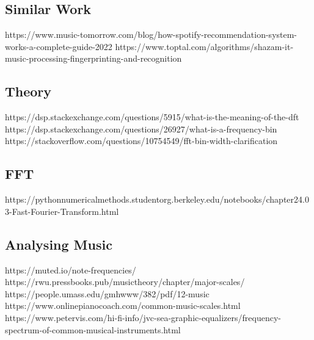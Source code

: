 \documentclass[conference]{IEEEtran}
\begin{document}
\subsection{Similar Work}
https://www.music-tomorrow.com/blog/how-spotify-recommendation-system-works-a-complete-guide-2022
https://www.toptal.com/algorithms/shazam-it-music-processing-fingerprinting-and-recognition
\subsection{Theory}
https://dsp.stackexchange.com/questions/5915/what-is-the-meaning-of-the-dft
https://dsp.stackexchange.com/questions/26927/what-is-a-frequency-bin
https://stackoverflow.com/questions/10754549/fft-bin-width-clarification
\subsection{FFT}
https://pythonnumericalmethods.studentorg.berkeley.edu/notebooks/chapter24.03-Fast-Fourier-Transform.html
\subsection{Analysing Music}
https://muted.io/note-frequencies/
https://rwu.pressbooks.pub/musictheory/chapter/major-scales/
https://people.umass.edu/gmhwww/382/pdf/12-music%
https://www.onlinepianocoach.com/common-music-scales.html
https://www.petervis.com/hi-fi-info/jvc-sea-graphic-equalizers/frequency-spectrum-of-common-musical-instruments.html
\end{document}
